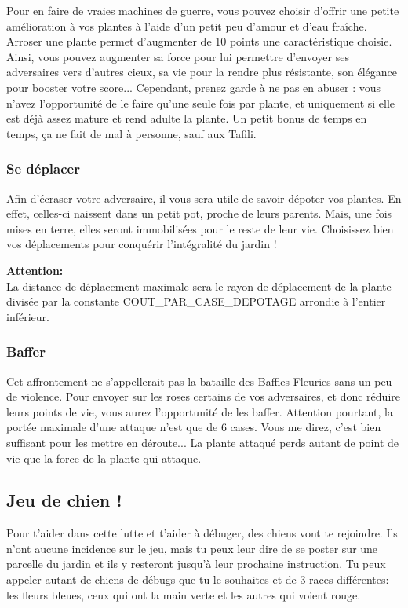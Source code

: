 Pour en faire de vraies machines de guerre, vous pouvez choisir d'offrir une petite amélioration à vos plantes à l'aide d'un petit peu d'amour et d'eau fraîche. Arroser une plante permet d'augmenter de 10 points une caractéristique choisie. Ainsi, vous pouvez augmenter sa force pour lui permettre d'envoyer ses adversaires vers d'autres cieux, sa vie pour la rendre plus résistante, son élégance pour booster votre score... Cependant, prenez garde à ne pas en abuser : vous n'avez l'opportunité de le faire qu'une seule fois par plante, et uniquement si elle est déjà assez mature et rend adulte la plante. Un petit bonus de temps en temps, ça ne fait de mal à personne, sauf aux Tafili.

\subsubsection{Se déplacer}
Afin d'écraser votre adversaire, il vous sera utile de savoir dépoter vos plantes. En effet, celles-ci naissent dans un petit pot, proche de leurs parents. Mais, une fois mises en terre, elles seront immobilisées pour le reste de leur vie. Choisissez bien vos déplacements pour conquérir l'intégralité du jardin !

\textbf{Attention:}\\
La distance de déplacement maximale sera le rayon de déplacement de la plante divisée par la constante COUT\_PAR\_CASE\_DEPOTAGE arrondie à l'entier inférieur.

\subsubsection{Baffer}
Cet affrontement ne s'appellerait pas la bataille des Baffles Fleuries sans un peu de violence. Pour envoyer sur les roses certains de vos adversaires, et donc réduire leurs points de vie, vous aurez l'opportunité de les baffer. Attention pourtant, la portée maximale d'une attaque n'est que de 6 cases. Vous me direz, c'est bien suffisant pour les mettre en déroute... La plante attaqué perds autant de point de vie que la force de la plante qui attaque.

\subsection{Jeu de chien !}
Pour t'aider dans cette lutte et t'aider à débuger, des chiens vont te rejoindre. Ils n'ont aucune incidence sur le jeu, mais tu peux leur dire de se poster sur une parcelle du jardin et ils y resteront jusqu'à leur prochaine instruction. Tu peux appeler autant de chiens de débugs que tu le souhaites et de 3 races différentes: les fleurs bleues, ceux qui ont la main verte et les autres qui voient rouge.

